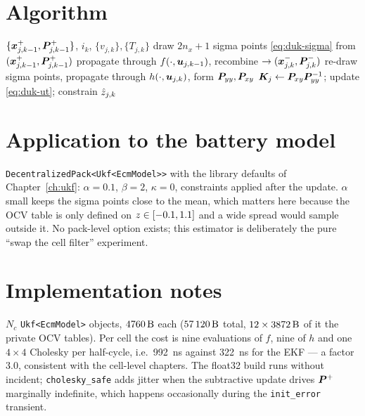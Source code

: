 \section{Algorithm}
\begin{algorithm}[H]
\caption{Decentralized-UKF --- one sampling period $k$}
\begin{algorithmic}[1]
\Require $\{\bm{x}^+_{j,k-1},\bm{P}^{+}_{j,k-1}\}$, $i_k$, $\{v_{j,k}\},\{T_{j,k}\}$
  \State draw $2n_x+1$ sigma points \eqref{eq:duk-sigma} from $(\bm{x}^+_{j,k-1},\bm{P}^{+}_{j,k-1})$
  \State propagate through $f(\cdot,\bm{u}_{j,k-1})$, recombine $\to(\bm{x}^-_{j,k},\bm{P}^{-}_{j,k})$
  \State re-draw sigma points, propagate through $h(\cdot,\bm{u}_{j,k})$, form $\bm{P}_{yy},\bm{P}_{xy}$
  \State $\bm{K}_j\gets\bm{P}_{xy}\bm{P}_{yy}^{-1}$;\; update \eqref{eq:duk-ut};\; constrain
\EndFor
\Ensure $\hat{z}_{j,k}$
\end{algorithmic}
\end{algorithm}

\section{Application to the battery model}
\texttt{DecentralizedPack<Ukf<EcmModel>>} with the library defaults of Chapter~\ref{ch:ukf}:
$\alpha=\num{0.1}$, $\beta=2$, $\kappa=0$, constraints applied after the update. $\alpha$ small
keeps the sigma points close to the mean, which matters here because the OCV table is only defined
on $z\in[-0.1,1.1]$ and a wide spread would sample outside it. No pack-level option exists;
this estimator is deliberately the pure ``swap the cell filter'' experiment.

\section{Implementation notes}
$N_c$ \texttt{Ukf<EcmModel>} objects, $\SI{4760}{\byte}$ each ($\SI{57120}{\byte}$ total,
$12\times\SI{3872}{\byte}$ of it the private OCV tables). Per cell the cost is nine evaluations of
$f$, nine of $h$ and one $4\times4$ Cholesky per half-cycle, i.e.\ \SI{992}{\nano\second} against
\SI{322}{\nano\second} for the EKF --- a factor \num{3.0}, consistent with the cell-level chapters.
The float32 build runs without incident; \texttt{cholesky\_safe} adds jitter when the subtractive
update drives $\bm{P}^{+}$ marginally indefinite, which happens occasionally during the
\texttt{init\_error} transient.


